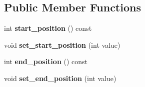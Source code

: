 \subsection*{Public Member Functions}
\begin{DoxyCompactItemize}
\item 
\hypertarget{classv8_1_1internal_1_1_j_s_message_object_a4c3a5538df9f385be211f74e97a7e043}{}int {\bfseries start\+\_\+position} () const \label{classv8_1_1internal_1_1_j_s_message_object_a4c3a5538df9f385be211f74e97a7e043}

\item 
\hypertarget{classv8_1_1internal_1_1_j_s_message_object_a8ac0f4bf97444300b00cc4813f950ea8}{}void {\bfseries set\+\_\+start\+\_\+position} (int value)\label{classv8_1_1internal_1_1_j_s_message_object_a8ac0f4bf97444300b00cc4813f950ea8}

\item 
\hypertarget{classv8_1_1internal_1_1_j_s_message_object_aeb6c1a077514b3428198147436431af5}{}int {\bfseries end\+\_\+position} () const \label{classv8_1_1internal_1_1_j_s_message_object_aeb6c1a077514b3428198147436431af5}

\item 
\hypertarget{classv8_1_1internal_1_1_j_s_message_object_a3544790992d95316179ffc62c528882c}{}void {\bfseries set\+\_\+end\+\_\+position} (int value)\label{classv8_1_1internal_1_1_j_s_message_object_a3544790992d95316179ffc62c528882c}

\end{DoxyCompactItemize}
